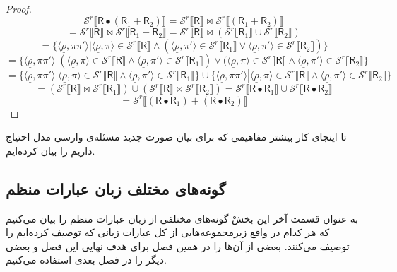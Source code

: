 \begin{proof}
	$$\mathcal{S}^r \llbracket \mathsf{R}\bullet (\mathsf{R}_1 + \mathsf{R}_2) \rrbracket =\mathcal{S}^r \llbracket \mathsf{R} \rrbracket \Join \mathcal{S}^r \llbracket (\mathsf{R}_1+\mathsf{R}_2) \rrbracket$$
	$$=\mathcal{S}^r \llbracket \mathsf{R} \rrbracket \Join \mathcal{S}^r \llbracket \mathsf{R}_1+\mathsf{R}_2 \rrbracket=\mathcal{S}^r \llbracket \mathsf{R} \rrbracket \Join (\mathcal{S}^r \llbracket \mathsf{R}_1 \rrbracket \cup \mathcal{S}^r\llbracket \mathsf{R}_2 \rrbracket)$$
	$$= \{ \langle \underline{\rho}, \pi \pi' \rangle| \langle \underline{\rho}, \pi \rangle \in \mathcal{S}^r \llbracket \mathsf{R} \rrbracket \land (\langle \underline{\rho},\pi'\rangle \in \mathcal{S}^r \llbracket \mathsf{R}_1 \rrbracket\lor \langle \underline{\rho} , \pi' \rangle \in \mathcal{S}^r \llbracket \mathsf{R}_2 \rrbracket) \}$$
	$$=\{ \langle \underline{\rho}, \pi \pi' \rangle| (\langle \underline{\rho}, \pi \rangle \in \mathcal{S}^r \llbracket \mathsf{R} \rrbracket \land \langle \underline{\rho},\pi'\rangle \in \mathcal{S}^r \llbracket \mathsf{R}_1 \rrbracket) \lor (\langle \underline{\rho}, \pi \rangle \in \mathcal{S}^r \llbracket \mathsf{R} \rrbracket \land \langle \underline{\rho} , \pi' \rangle \in \mathcal{S}^r \llbracket \mathsf{R}_2 \rrbracket  \}$$
	$$=\{ \langle \underline{\rho}, \pi \pi' \rangle|\langle \underline{\rho}, \pi \rangle \in \mathcal{S}^r \llbracket \mathsf{R} \rrbracket \land \langle \underline{\rho},\pi'\rangle \in \mathcal{S}^r \llbracket \mathsf{R}_1 \rrbracket\} \cup
	\{ \langle \underline{\rho}, \pi \pi' \rangle|\langle \underline{\rho}, \pi \rangle \in \mathcal{S}^r \llbracket \mathsf{R} \rrbracket \land \langle \underline{\rho},\pi'\rangle \in \mathcal{S}^r \llbracket \mathsf{R}_2 \rrbracket\}$$
	$$=(\mathcal{S}^r \llbracket \mathsf{R} \rrbracket \Join \mathcal{S}^r \llbracket \mathsf{R}_1\rrbracket ) \cup (\mathcal{S}^r \llbracket \mathsf{R} \rrbracket \Join \mathcal{S}^r \llbracket \mathsf{R}_2 \rrbracket)=
	\mathcal{S}^r \llbracket \mathsf{R\bullet R}_1 \rrbracket \cup \mathcal{S}^r \llbracket \mathsf{R\bullet R}_2 \rrbracket$$
	$$=\mathcal{S}^r \llbracket (\mathsf{R \bullet R}_1) + (\mathsf{R \bullet R}_2) \rrbracket $$
\end{proof}
تا اینجای کار بیشتر مفاهیمی که برای بیان صورت جدید مسئله‌ی وارسی مدل احتیاج داریم را بیان کرده‌ایم. 
\subsection{گونه‌های مختلف زبان عبارات منظم}
به عنوان قسمت آخر این بخشْ گونه‌های مختلفی از زبان عبارات منظم را بیان می‌کنیم که هر کدام در واقع زیرمجموعه‌هایی از کل عبارات زبانی که توصیف کرده‌ایم را توصیف می‌کنند. بعضی از آن‌ها را در همین فصل برای هدف نهایی این فصل و بعضی دیگر را در فصل بعدی استفاده می‌کنیم.

